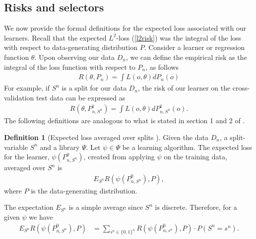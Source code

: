 \documentclass[11pt, a4paper]{article}
\theoremstyle{definition}
\newtheorem{definition}[theorem]{Definition}
\theoremstyle{remark}
\newcommand{\btheta}{\theta}
\newcommand{\la}{\psi}
\newcommand{\Sn}{S^n}
\newcommand{\lib}{\Psi}
\begin{document}
\subsection{Risks and selectors}
We now provide the formal definitions for the expected loss associated with our learners. Recall that the expected $L^2$-loss (\ref{l2risk}) was the integral of the loss with respect to data-generating distribution $P$. Consider a learner or regression function $ \theta $. Upon observing our data $D_n$, we can define the empirical risk as the integral of the loss function with respect to $P_n$, as follows
\begin{align*}
    R(\btheta , P_n) = \int L(o, \btheta) d P_{n}(o) 
\end{align*}
For example, if $\Sn$ is a split for our data $D_n$, the risk of our learner on the cross-validation test data can be expressed as
 \begin{align*}
     R(\theta, P_{n, \Sn}^{1}) =  \int L(o, \btheta) d P_{n,\Sn}^{1}(o).
 \end{align*}
 The following definitions are analogous to what is stated in section 1 and 2 of  \parencite{laan03}.
 \begin{definition}[Expected loss averaged over splits \parencite{vaart06}]
     Given the data $D_n$, a split-variable $\Sn$ and a library $ \lib $. Let $ \la \in \lib $ be a learning algorithm. The expected loss for the learner, $\la(P_{n,\Sn}^0)$, created from applying $ \la $ on the training data, averaged over $ \Sn $ is  
    \begin{align*}
        E_{\Sn} R( \la(P_{n,\Sn}^{0}), P),
    \end{align*}
    where $ P $ is the data-generating distribution.
\end{definition}
The expectation $ E_{\Sn} $ is a simple average since $ \Sn $ is discrete. Therefore, for a given $ \la $ we have 
\begin{align*}
    E_{\Sn} R( \la(P_{n,\Sn}^{0}), P) &= \sum_{s^{n} \in \{0,1\}^{n}} R(\la(P_{n, s^{n}}^{0}), P) \cdot P(\Sn = s^{n}). 
\end{align*}
\end{document}
